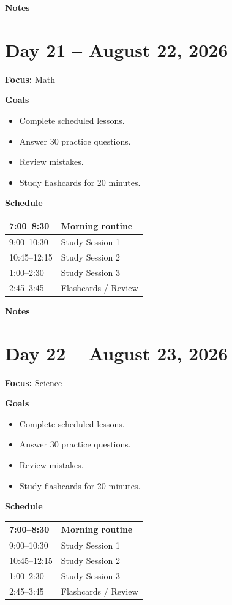 \vspace{1em}
\textbf{Notes}

\vspace{8cm}

\newpage

\section*{Day 21 -- August 22, 2026}
\textbf{Focus:} Math

\textbf{Goals}
\begin{itemize}
\item Complete scheduled lessons.
\item Answer 30 practice questions.
\item Review mistakes.
\item Study flashcards for 20 minutes.
\end{itemize}

\textbf{Schedule}
\begin{tabular}{|p{4cm}|p{10cm}|}\hline
7:00--8:30 & Morning routine \\\hline
9:00--10:30 & Study Session 1 \\\hline
10:45--12:15 & Study Session 2 \\\hline
1:00--2:30 & Study Session 3 \\\hline
2:45--3:45 & Flashcards / Review \\\hline
\end{tabular}

\vspace{1em}
\textbf{Notes}

\vspace{8cm}

\newpage

\section*{Day 22 -- August 23, 2026}
\textbf{Focus:} Science

\textbf{Goals}
\begin{itemize}
\item Complete scheduled lessons.
\item Answer 30 practice questions.
\item Review mistakes.
\item Study flashcards for 20 minutes.
\end{itemize}

\textbf{Schedule}
\begin{tabular}{|p{4cm}|p{10cm}|}\hline
7:00--8:30 & Morning routine \\\hline
9:00--10:30 & Study Session 1 \\\hline
10:45--12:15 & Study Session 2 \\\hline
1:00--2:30 & Study Session 3 \\\hline
2:45--3:45 & Flashcards / Review \\\hline
\end{tabular}

